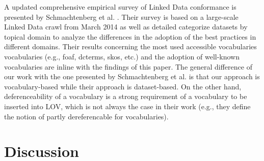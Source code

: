 \documentclass{iosart2c}
\begin{document}
A updated comprehensive empirical survey of Linked Data conformance is presented by Schmachtenberg et al. \cite{max2014}. Their survey is based on a large-scale Linked Data crawl from March 2014 as well as detailed categorize datasets by topical domain to analyze the differences in the adoption of the best practices in different domains. Their results concerning the most used accessible vocabularies vocabularies (e.g., foaf, dcterms, skos, etc.) and the adoption of well-known vocabularies are inline with the findings of this paper. The general difference of our work with the one presented by Schmachtenberg et al. is that our approach is vocabulary-based while their approach is dataset-based. On the other hand, deferenceability of a vocabulary is a strong requirement of a vocabulary to be inserted into LOV, which is not always the case in their work (e.g., they define the notion of partly dereferencable for vocabularies).




\section{Discussion}
\end{document}
